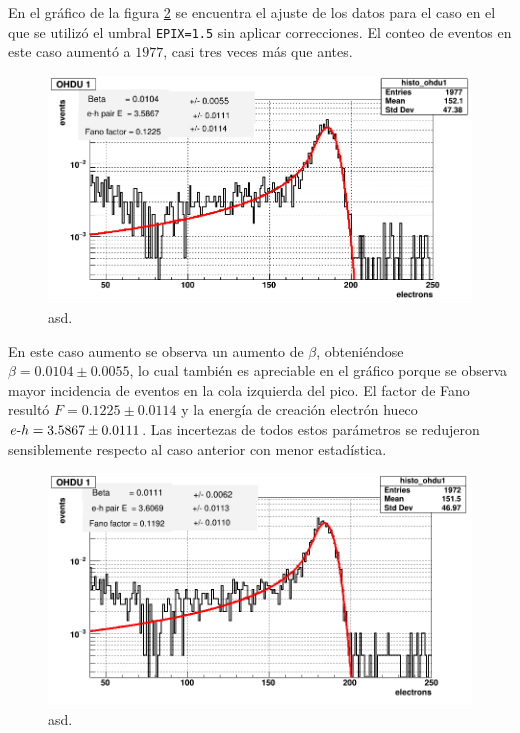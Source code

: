 En el gráfico de la figura \ref{fig:F_OHDU0_EPIX15conCorr} se encuentra el ajuste de los datos para el caso en el que se utilizó el umbral \verb|EPIX=1.5| sin aplicar correcciones. El conteo de eventos en este caso aumentó a $1977$, casi tres veces más que antes.
\begin{figure}[h]
    \centering
        \includegraphics[scale=0.4]{pngs/F_OHDU0_EPIX15_sinCorr.png}
    \caption{\footnotesize{asd.}}
    \label{fig:F_OHDU0_EPIX15sinCorr}
\end{figure}
En este caso aumento se observa un aumento de $\beta$, obteniéndose $\beta = 0.0104 \pm 0.0055$, lo cual también es apreciable en el gráfico porque se observa mayor incidencia de eventos en la cola izquierda del pico. El factor de Fano resultó $F = 0.1225 \pm 0.0114$ y la energía de creación electrón hueco $e\mbox{-}h = 3.5867 \pm 0.0111$. Las incertezas de todos estos parámetros se redujeron sensiblemente respecto al caso anterior con menor estadística.


\begin{figure}[h]
    \centering
        \includegraphics[scale=0.4]{pngs/F_OHDU0_EPIX15_conCorr.png}
    \caption{\footnotesize{asd.}}
    \label{fig:F_OHDU0_EPIX15conCorr}
\end{figure}

